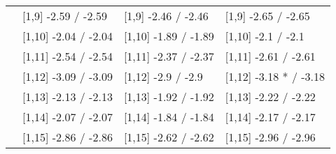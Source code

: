 \begin{table}
\begin{tabular}[t]{llll}
 & {}[1,9] -2.59  / -2.59 & {}[1,9] -2.46  / -2.46 & {}[1,9] -2.65  / -2.65\\
 & {}[1,10] -2.04  / -2.04 & {}[1,10] -1.89  / -1.89 & {}[1,10] -2.1  / -2.1\\
 & {}[1,11] -2.54  / -2.54 & {}[1,11] -2.37  / -2.37 & {}[1,11] -2.61  / -2.61\\
 & {}[1,12] -3.09  / -3.09 & {}[1,12] -2.9  / -2.9 & {}[1,12] -3.18 * / -3.18\\
\addlinespace
 & {}[1,13] -2.13  / -2.13 & {}[1,13] -1.92  / -1.92 & {}[1,13] -2.22  / -2.22\\
 & {}[1,14] -2.07  / -2.07 & {}[1,14] -1.84  / -1.84 & {}[1,14] -2.17  / -2.17\\
 & {}[1,15] -2.86  / -2.86 & {}[1,15] -2.62  / -2.62 & {}[1,15] -2.96  / -2.96\\
\bottomrule
\end{tabular}
\end{table}

